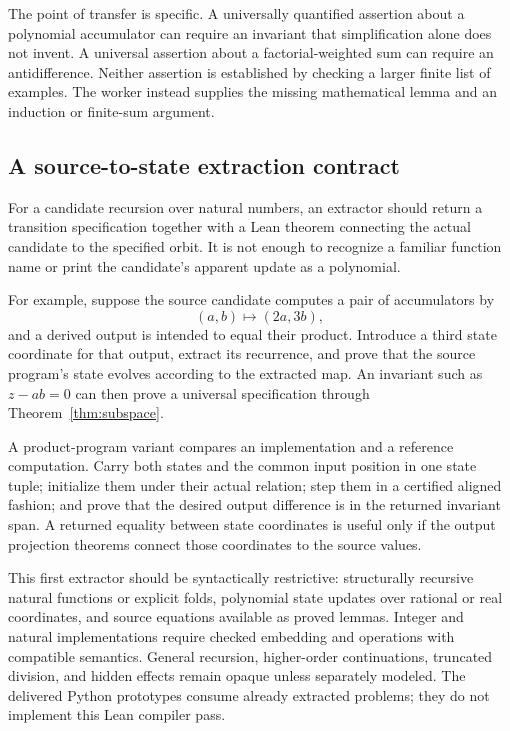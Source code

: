 \documentclass[11pt,letterpaper]{article}
\theoremstyle{definition}\newtheorem{definition}[theorem]{Definition}
\theoremstyle{remark}\newtheorem{remark}[theorem]{Remark}
\begin{document}
The point of transfer is specific. A universally quantified assertion about a
polynomial accumulator can require an invariant that simplification alone does
not invent. A universal assertion about a factorial-weighted sum can require an
antidifference. Neither assertion is established by checking a larger finite
list of examples. The worker instead supplies the missing mathematical lemma
and an induction or finite-sum argument.

\subsection{A source-to-state extraction contract}
For a candidate recursion over natural numbers, an extractor should return a
transition specification together with a Lean theorem connecting the actual
candidate to the specified orbit. It is not enough to recognize a familiar
function name or print the candidate's apparent update as a polynomial.

For example, suppose the source candidate computes a pair of accumulators by
\[
 (a,b)\longmapsto(2a,3b),
\]
and a derived output is intended to equal their product. Introduce a third
state coordinate for that output, extract its recurrence, and prove that the
source program's state evolves according to the extracted map. An invariant
such as $z-ab=0$ can then prove a universal specification through
Theorem~\ref{thm:subspace}.

A product-program variant compares an implementation and a reference
computation. Carry both states and the common input position in one state tuple;
initialize them under their actual relation; step them in a certified aligned
fashion; and prove that the desired output difference is in the returned
invariant span. A returned equality between state coordinates is useful only
if the output projection theorems connect those coordinates to the source
values.

This first extractor should be syntactically restrictive: structurally
recursive natural functions or explicit folds, polynomial state updates over
rational or real coordinates, and source equations available as proved lemmas.
Integer and natural implementations require checked embedding and operations
with compatible semantics. General recursion, higher-order continuations,
truncated division, and hidden effects remain opaque unless separately modeled.
The delivered Python prototypes consume already extracted problems; they do not
implement this Lean compiler pass.
\end{document}
